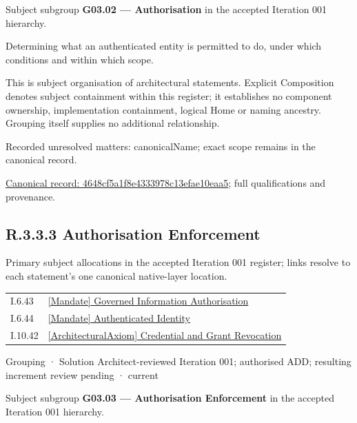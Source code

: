 Subject subgroup \textbf{G03.02 — Authorisation} in the accepted Iteration 001 hierarchy.



Determining what an authenticated entity is permitted to do, under which conditions and within which scope.



This is subject organisation of architectural statements. Explicit Composition denotes subject containment within this register; it establishes no component ownership, implementation containment, logical Home or naming ancestry. Grouping itself supplies no additional relationship.


{\small Recorded unresolved matters: canonicalName; exact scope remains in the canonical record.}\par
{\footnotesize \href{../../../../continuum/grouping/4648cf5a1f8e4333978c13efae10eaa5.md}{Canonical record: 4648cf5a1f8e4333978c13efae10eaa5}; full qualifications and provenance.}\par
\subsection*{R.3.3.3 Authorisation Enforcement}
\label{navigation:R.3.3.3}

Primary subject allocations in the accepted Iteration 001 register; links resolve to each statement’s one canonical native-layer location.\par
\begin{longtable}{p{.22\linewidth}p{.73\linewidth}}
I.6.43 & \hyperref[element:8812fcd52d3f4afcbeef41b60bda5874]{[Mandate] Governed Information Authorisation} \\
I.6.44 & \hyperref[element:72b6d13c85944e2d93efc6c5f5a53d82]{[Mandate] Authenticated Identity} \\
I.10.42 & \hyperref[element:370d9a6e0e00402aba9720580a2e365e]{[ArchitecturalAxiom] Credential and Grant Revocation} \\
\end{longtable}
\label{element:fe8916b03b084e82af587ac5a900349b}
{\small Grouping · Solution Architect-reviewed Iteration 001; authorised ADD; resulting increment review pending · current}\par

Subject subgroup \textbf{G03.03 — Authorisation Enforcement} in the accepted Iteration 001 hierarchy.



